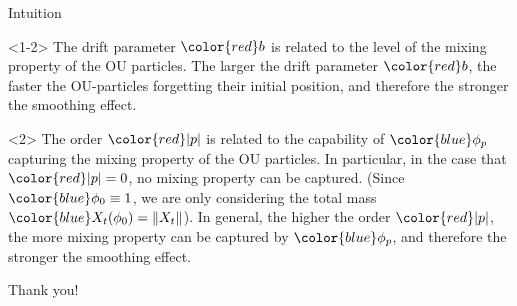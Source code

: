 \documentclass[xcolor=dvipsnames]{beamer}
\begin{document}
\begin{frame}{Intuition}
\begin{block}{}<1-2>
	The {\color{PineGreen}drift parameter} $\color{red}b$ is related to the level of the mixing property of the OU particles.
		The {\color{PineGreen}larger the drift parameter} $\color{red}b$, the faster the OU-particles forgetting their initial position, and therefore the {\color{PineGreen}stronger the smoothing effect}.
\end{block}
\begin{block}{}<2>
		The {\color{PineGreen}order} ${\color{red}|p|}$ is related to the capability of $\color{blue}\phi_p$ capturing the mixing property of the OU particles.
		In particular, in the case that $\color{red}|p| = 0$, no mixing property can be captured. (Since $\color{blue}\phi_0 \equiv 1$, we are only considering the total mass $\color{blue}X_t(\phi_0)=\|X_t\|$).
		In general, the {\color{PineGreen}higher the order} ${\color{red}|p|}$, the more mixing property can be captured by $\color{blue}\phi_p$, and therefore the {\color{PineGreen}stronger the smoothing effect}.
\end{block}
\end{frame}

\begin{frame}
\begin{center}
\Huge{Thank you!}
\end{center}
\begin{center}
\end{center}
\end{frame}
\end{document}
